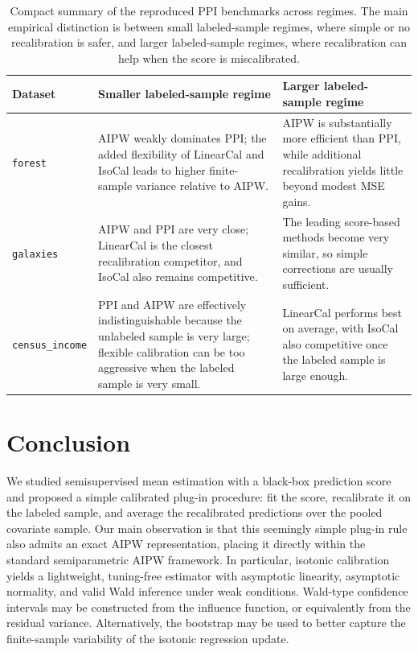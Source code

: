 \documentclass{article}
\theoremstyle{plain}
\theoremstyle{definition}
\newcommand{\1}{\mathbbm{1}}
\begin{document}
\begin{table}[htb]
\centering
\small
\begin{tabular}{p{}p{}p{}}
\toprule
Dataset & Smaller labeled-sample regime & Larger labeled-sample regime \\
\midrule
\texttt{forest} & AIPW weakly dominates PPI; the added flexibility of LinearCal and IsoCal leads to higher finite-sample variance relative to AIPW. & AIPW is substantially more efficient than PPI, while additional recalibration yields little beyond modest MSE gains. \\
\texttt{galaxies} & AIPW and PPI are very close; LinearCal is the closest recalibration competitor, and IsoCal also remains competitive. & The leading score-based methods become very similar, so simple corrections are usually sufficient. \\
\texttt{census\_income} & PPI and AIPW are effectively indistinguishable because the unlabeled sample is very large; flexible calibration can be too aggressive when the labeled sample is very small. & LinearCal performs best on average, with IsoCal also competitive once the labeled sample is large enough. \\
\bottomrule
\end{tabular}
\caption{Compact summary of the reproduced PPI benchmarks across regimes. The main empirical distinction is between small labeled-sample regimes, where simple or no recalibration is safer, and larger labeled-sample regimes, where recalibration can help when the score is miscalibrated.}
\label{tab:ppi-takeaways}
\end{table}

 


\section{Conclusion}

We studied semisupervised mean estimation with a black-box prediction score and proposed a simple calibrated plug-in procedure: fit the score, recalibrate it on the labeled sample, and average the recalibrated predictions over the pooled covariate sample. Our main observation is that this seemingly simple plug-in rule also admits an exact AIPW representation, placing it directly within the standard semiparametric AIPW framework. In particular, isotonic calibration yields a lightweight, tuning-free estimator with asymptotic linearity, asymptotic normality, and valid Wald inference under weak conditions. Wald-type confidence intervals may be constructed from the influence function, or equivalently from the residual variance. Alternatively, the bootstrap may be used to better capture the finite-sample variability of the isotonic regression update.
\end{document}

